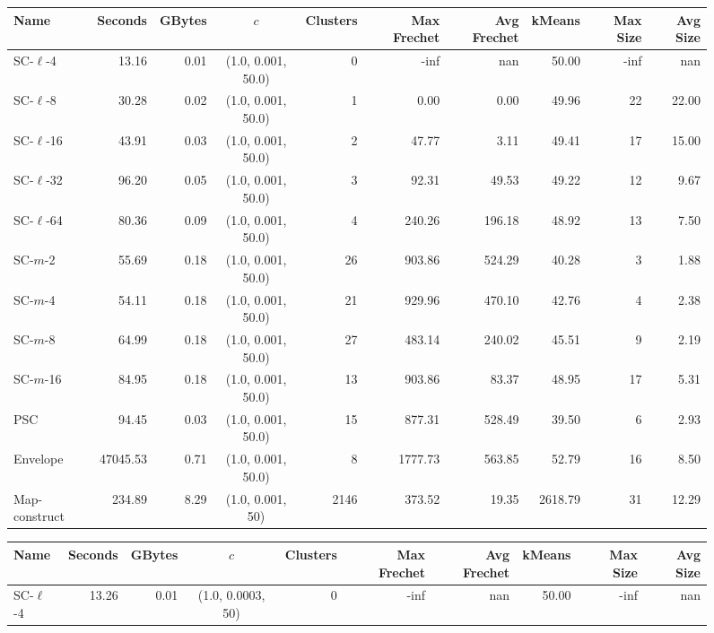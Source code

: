 \begin{figure} \begin{center}
    \begin{minipage}{\textwidth}
    {
    \begin{tabular}{@{}lrrcrrrrrr@{}}
        \toprule
        Name & Seconds & GBytes & $c$ & Clusters & Max Frechet & Avg Frechet & kMeans & Max Size & Avg Size\\
        \midrule
        SC-$\ell$-4 & 13.16 & 0.01 & (1.0, 0.001, 50.0) & 0 & -inf & nan & 50.00 & -inf & nan\\
        SC-$\ell$-8 & 30.28 & 0.02 & (1.0, 0.001, 50.0) & 1 & 0.00 & 0.00 & 49.96 & 22 & 22.00\\
        SC-$\ell$-16 & 43.91 & 0.03 & (1.0, 0.001, 50.0) & 2 & 47.77 & 3.11 & 49.41 & 17 & 15.00\\
        SC-$\ell$-32 & 96.20 & 0.05 & (1.0, 0.001, 50.0) & 3 & 92.31 & 49.53 & 49.22 & 12 & 9.67\\
        SC-$\ell$-64 & 80.36 & 0.09 & (1.0, 0.001, 50.0) & 4 & 240.26 & 196.18 & 48.92 & 13 & 7.50\\
        SC-$m$-2 & 55.69 & 0.18 & (1.0, 0.001, 50.0) & 26 & 903.86 & 524.29 & 40.28 & 3 & 1.88\\
        SC-$m$-4 & 54.11 & 0.18 & (1.0, 0.001, 50.0) & 21 & 929.96 & 470.10 & 42.76 & 4 & 2.38\\
        SC-$m$-8 & 64.99 & 0.18 & (1.0, 0.001, 50.0) & 27 & 483.14 & 240.02 & 45.51 & 9 & 2.19\\
        SC-$m$-16 & 84.95 & 0.18 & (1.0, 0.001, 50.0) & 13 & 903.86 & 83.37 & 48.95 & 17 & 5.31\\
        PSC & 94.45 & 0.03 & (1.0, 0.001, 50.0) & 15 & 877.31 & 528.49 & 39.50 & 6 & 2.93\\
        Envelope & 47045.53 & 0.71 & (1.0, 0.001, 50.0) & 8 & 1777.73 & 563.85 & 52.79 & 16 & 8.50\\
        Map-construct & 234.89 & 8.29 & (1.0, 0.001, 50) & 2146 & 373.52 & 19.35 & 2618.79 & 31 & 12.29\\
        \bottomrule
    \end{tabular}
    }
    {
    \begin{tabular}{@{}lrrcrrrrrr@{}}
        \toprule
        Name & Seconds & GBytes & $c$ & Clusters & Max Frechet & Avg Frechet & kMeans & Max Size & Avg Size\\
        \midrule
        SC-$\ell$-4 & 13.26 & 0.01 & (1.0, 0.0003, 50) & 0 & -inf & nan & 50.00 & -inf & nan\\

\end{tabular}}
\end{minipage}
\end{center}
\end{figure}
